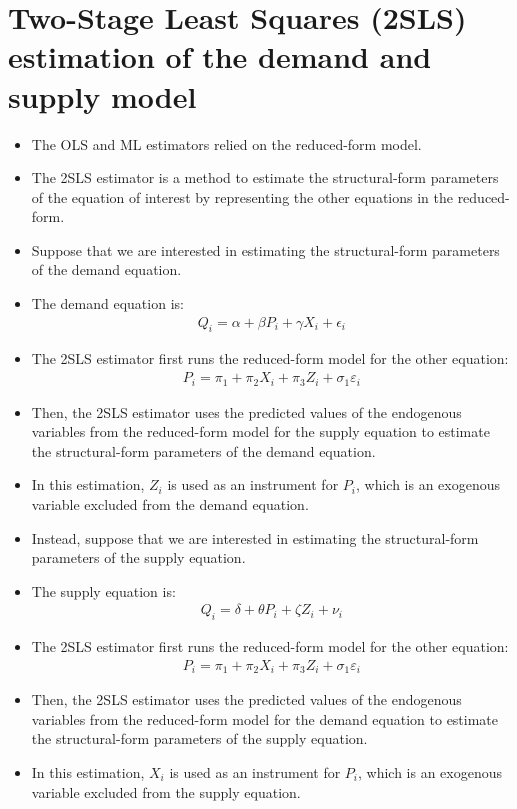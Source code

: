 \documentclass[
]{book}
\providecommand{\tightlist}{%
  \setlength{\itemsep}{0pt}\setlength{\parskip}{0pt}}
\begin{document}
\hypertarget{two-stage-least-squares-2sls-estimation-of-the-demand-and-supply-model}{%
\section{Two-Stage Least Squares (2SLS) estimation of the demand and supply model}\label{two-stage-least-squares-2sls-estimation-of-the-demand-and-supply-model}}

\begin{itemize}
\tightlist
\item
  The OLS and ML estimators relied on the reduced-form model.
\item
  The 2SLS estimator is a method to estimate the structural-form parameters of the equation of interest by representing the other equations in the reduced-form.
\item
  Suppose that we are interested in estimating the structural-form parameters of the demand equation.
\item
  The demand equation is:
  \begin{align}
    Q_i = \alpha + \beta P_i + \gamma X_i + \epsilon_i
  \end{align}
\item
  The 2SLS estimator first runs the reduced-form model for the other equation:
  \begin{align}
    P_i = \pi_1 + \pi_2 X_i + \pi_3 Z_i + \sigma_1 \varepsilon_i
  \end{align}
\item
  Then, the 2SLS estimator uses the predicted values of the endogenous variables from the reduced-form model for the supply equation to estimate the structural-form parameters of the demand equation.
\item
  In this estimation, \(Z_i\) is used as an instrument for \(P_i\), which is an exogenous variable excluded from the demand equation.
\item
  Instead, suppose that we are interested in estimating the structural-form parameters of the supply equation.
\item
  The supply equation is:
  \begin{align}
    Q_i = \delta + \theta P_i + \zeta Z_i + \nu_i
  \end{align}
\item
  The 2SLS estimator first runs the reduced-form model for the other equation:
  \begin{align}
    P_i = \pi_1 + \pi_2 X_i + \pi_3 Z_i + \sigma_1 \varepsilon_i
  \end{align}
\item
  Then, the 2SLS estimator uses the predicted values of the endogenous variables from the reduced-form model for the demand equation to estimate the structural-form parameters of the supply equation.
\item
  In this estimation, \(X_i\) is used as an instrument for \(P_i\), which is an exogenous variable excluded from the supply equation.
\end{itemize}
\end{document}
